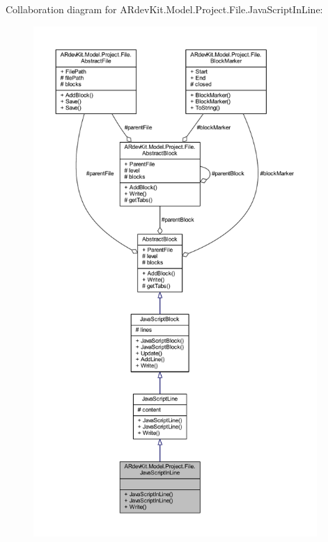 Collaboration diagram for A\-Rdev\-Kit.\-Model.\-Project.\-File.\-Java\-Script\-In\-Line\-:
\nopagebreak
\begin{figure}[H]
\begin{center}
\leavevmode
\includegraphics[height=550pt]{class_a_rdev_kit_1_1_model_1_1_project_1_1_file_1_1_java_script_in_line__coll__graph}
\end{center}
\end{figure}
